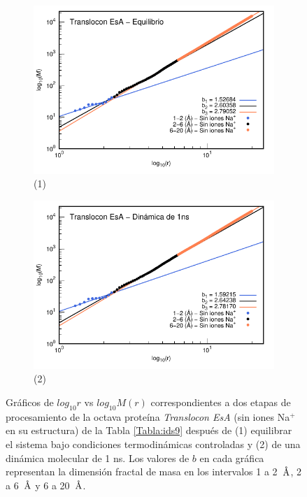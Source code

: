 	
	\begin{figure}[H]
		\centering
		\begin{subfigure}{0.49\textwidth}
			\centering
			\includegraphics[width=\linewidth,page=1]{graphs/PDBs/7khw/ions/7khwEq-oions.pdf}
			\caption{(1)}
		\end{subfigure}
		\hfill
		\begin{subfigure}{0.49\textwidth}
			\centering
			\includegraphics[width=\linewidth,page=1]{graphs/PDBs/7khw/ions/7khw1ns-oions.pdf}
			\caption{(2)}
		\end{subfigure}
		\caption{Gr\'{a}ficos de $log_{10}r$ vs $log_{10}M(r)$ correspondientes a dos etapas de procesamiento de la octava prote\'{i}na \textit{Translocon EsA} (sin iones Na$^{+}$ en su estructura) de la Tabla \ref{Tabla:ids9} despu\'{e}s de (1) equilibrar el sistema bajo condiciones termodin\'{a}micas controladas y (2) de una din\'{a}mica molecular de 1 ns. Los valores de $b$ en cada gr\'{a}fica representan la dimensi\'{o}n fractal de masa en los intervalos 1 a 2~$\textup{\r{A}}$, 2 a 6~$\textup{\r{A}}$ y 6 a 20~$\textup{\r{A}}$.}
		\label{fig:7khw-oions}
	\end{figure}
	
